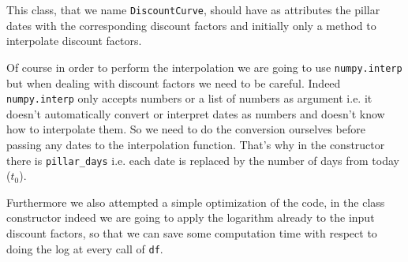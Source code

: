This class, that we name \texttt{DiscountCurve}, should have as attributes the pillar dates 
with the corresponding discount factors and initially only a method to interpolate discount 
factors.

Of course in order to perform the interpolation we are going to use \texttt{numpy.interp} but
when dealing with discount factors we need to be careful. Indeed \texttt{numpy.interp} only 
accepts numbers or a list of numbers as argument i.e. it doesn't automatically convert or 
interpret dates as numbers and doesn't know how to interpolate them. So we need to do 
the conversion ourselves before passing any dates to the interpolation function.
That's why in the constructor there is \texttt{pillar\_days} i.e. each date is replaced 
by the number of days from today ($t_0$).

Furthermore we also attempted a simple optimization of the code, in the class constructor indeed
we are going to apply the logarithm already to the input discount factors, so that we can save
some computation time with respect to doing the log at every call of \texttt{df}. 

